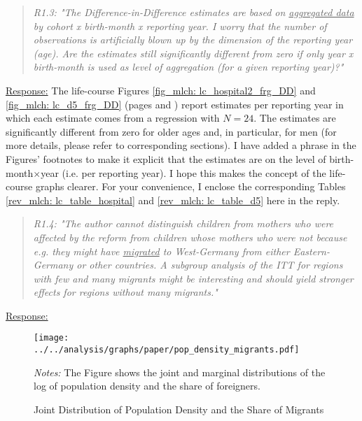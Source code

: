 \bigskip
{}
\begin{quote}
	\textit{R1.3: "The Difference-in-Difference estimates are based on \underline{aggregated data} by cohort x birth-month x reporting year. I worry that the number of observations is artificially blown up by the dimension of the reporting year (age). Are the estimates still significantly different from zero if only year x birth-month is used as level of aggregation (for a given reporting year)?"}
\end{quote}
\underline{Response:} The life-course Figures \ref{fig_mlch: lc_hospital2_frg_DD} and \ref{fig_mlch: lc_d5_frg_DD} (pages \pageref{fig_mlch: lc_hospital2_frg_DD} and \pageref{fig_mlch: lc_d5_frg_DD}) report estimates per reporting year in which each estimate comes from a regression with $N=24$. The estimates are significantly different from zero for older ages and, in particular, for men (for more details, please refer to corresponding sections). I have added a phrase in the Figures' footnotes to make it explicit that the estimates are on the level of birth-month$\times$year (i.e. per reporting year). I hope this makes the concept of the life-course graphs clearer. For your convenience, I enclose the corresponding Tables \ref{rev_mlch: lc_table_hospital} and \ref{rev_mlch: lc_table_d5} here in the reply.

\bigskip\bigskip





\bigskip
{}
\begin{quote}
	\textit{R1.4: "The author cannot distinguish children from mothers who were affected by the reform from children whose mothers who were not because e.g. they might have \underline{migrated} to West-Germany from either Eastern-Germany or other countries. A subgroup analysis of the ITT for regions with few and many migrants might be interesting and should yield stronger effects for regions without many migrants."}
\end{quote}
\underline{Response:}




\begin{figure}[H] \centering
	\caption{Joint Distribution of Population Density and the Share of Migrants}\label{ref_mlch: rev_pop_mig}
	\texttt{[image: ../../analysis/graphs/paper/pop\_density\_migrants.pdf]}
	\begin{minipage}{0.9\linewidth}
		\scriptsize{\emph{Notes:} The Figure shows the joint and marginal distributions of the log of population density and the share of foreigners.}
	\end{minipage}
\end{figure}

